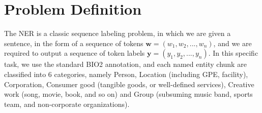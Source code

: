 \section{Problem Definition}
The NER is a classic sequence labeling problem, in which we are given a sentence, in the form of a sequence of tokens $\mathbf{w} = (w_1, w_2, ..., w_n)$, and we are required to output a sequence of token labels $\mathbf{y} = (y_1, y_2, ..., y_n)$. In this specific task, we use the  standard BIO2 annotation, and each named entity chunk are classified into 6 categories, namely Person, Location (including GPE, facility), Corporation, Consumer good (tangible goods, or well-defined services), Creative work (song, movie, book, and so on) and Group (subsuming music band, sports team, and non-corporate organizations).